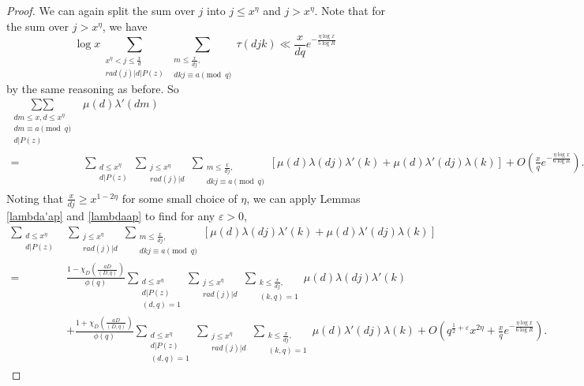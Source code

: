 \documentclass{amsart}
\begin{document}
\begin{proof}
We can again split the sum over $j$ into $j\leq x^\eta$ and $j>x^\eta$.  Note that for the sum over $j>x^\eta$, we have
$$\log x \sum_{\substack{x^\eta<j\leq \frac xd \\ rad(j)|d|P(z) }}\mathop{\sum}\limits_{\substack{m\leq \frac{x}{dj},\\ dkj\equiv a\pmod q }}\tau(djk)\ll \frac x{dq}e^{-\frac{\eta\log x}{5\log R}}$$
by the same reasoning as before.  So
\begin{align*}\mathop{\sum\sum}\limits_{\substack{dm\leq x,d\leq x^\eta \\ dm\equiv a\pmod q \\ d|P(z)}}&\mu(d)\lambda'(dm)\\
=&\sum_{\substack{d\leq x^\eta \\ d|P(z)}}\sum_{\substack{j\leq x^\eta \\ rad(j)|d}}\mathop{\sum}\limits_{\substack{m\leq \frac{x}{dj},\\ dkj\equiv a\pmod q }}\left[\mu(d)\lambda(dj)\lambda'(k)+\mu(d)\lambda'(dj)\lambda(k)\right]+O\left(\frac x{q}e^{-\frac{\eta\log x}{6\log R}}\right).
\end{align*}
Noting that $\frac{x}{dj}\geq x^{1-2\eta}$ for some small choice of $\eta$, we can apply Lemmas \ref{lambda'ap} and \ref{lambdaap} to find for any $\varepsilon>0$,
\begin{align*}
\sum_{\substack{d\leq x^\eta \\ d|P(z)}}&\sum_{\substack{j\leq x^\eta \\ rad(j)|d}}\mathop{\sum}\limits_{\substack{m\leq \frac{x}{dj},\\ dkj\equiv a\pmod q }}\left[\mu(d)\lambda(dj)\lambda'(k)+\mu(d)\lambda'(dj)\lambda(k)\right]\\
=&\frac{1-\chi_D\left(\frac{aD}{(D,q)}\right)}{\phi(q)}\sum_{\substack{d\leq x^\eta \\ d|P(z)\\ (d,q)=1}}\sum_{\substack{j\leq x^\eta \\ rad(j)|d}}\mathop{\sum}\limits_{\substack{k\leq \frac{x}{dj},\\ (k,q)=1 }}\mu(d)\lambda(dj)\lambda'(k)\\
&+\frac{1+\chi_D\left(\frac{aD}{(D,q)}\right)}{\phi(q)}\sum_{\substack{d\leq x^\eta \\ d|P(z)\\ (d,q)=1}}\sum_{\substack{j\leq x^\eta \\ rad(j)|d}}\mathop{\sum}\limits_{\substack{k\leq \frac{x}{dj},\\ (k,q)=1 }}\mu(d)\lambda'(dj)\lambda(k)+O\left(q^{\frac 12+\varepsilon}x^{2\eta}+\frac xqe^{-\frac{\eta\log x}{6\log R}}\right).

\end{align*}
\end{proof}
\end{document}
